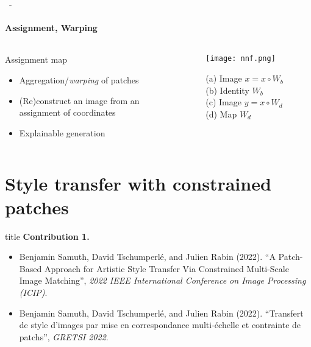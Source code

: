 \documentclass[aspectratio=169, 22pt]{beamer}
\begin{document}
\begin{frame}{\secname~- \subsecname} 
  \framesubtitle{Assignment, Warping}
  \begin{columns}
    \begin{column}{0.55\linewidth}
      \begin{exampleblock}{Assignment map}
        \begin{itemize}
        \item Aggregation/\emph{warping} of patches
        \item (Re)construct an image from an \alert{assignment of coordinates}
        \item Explainable generation
        \end{itemize}
      \end{exampleblock}
    \end{column}
    \begin{column}{0.45\linewidth}
      \begin{figure}
        \centering
        \texttt{[image: nnf.png]}
        \caption{(a) Image $x = x \circ W_b$ \quad(b) Identity $W_b$
          \\ (c) Image $y = x \circ W_d$ \quad(d) Map $W_d$}
      \end{figure}
    \end{column}
  \end{columns}
\end{frame}


\section{Style transfer with constrained patches}
\begin{frame}
  \vfill
  \begin{beamercolorbox}[sep=15pt,center,shadow=true,rounded=true]{title}
    \LARGE\bfseries Contribution 1.\\ \secname
  \end{beamercolorbox}
  \vfill
  \begin{itemize}
  \item \footnotesize Benjamin Samuth, David
    Tschumperlé, and Julien Rabin (2022). ``A Patch-Based Approach for
    Artistic Style Transfer Via Constrained Multi-Scale Image
    Matching'', \emph{2022 IEEE International Conference on Image
      Processing (ICIP)}.
  \item \footnotesize Benjamin Samuth, David Tschumperlé, and Julien Rabin (2022).
    ``Transfert de style d’images par mise en correspondance multi-échelle et
    contrainte de patchs'', \emph{GRETSI 2022}.
  \end{itemize}
\end{frame}
\end{document}
